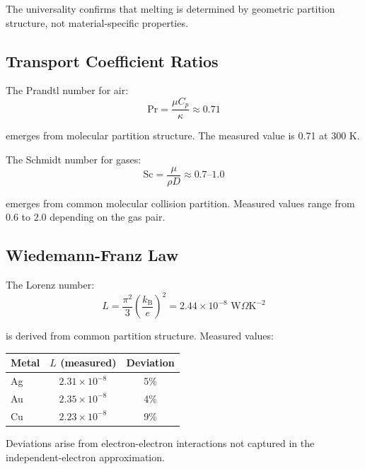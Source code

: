 \documentclass[twocolumn,10pt,aps,prd,superscriptaddress,nofootinbib]{revtex4-2}
\theoremstyle{remark}
\newcommand{\kB}{k_{\mathrm{B}}}
\begin{document}
The universality confirms that melting is determined by geometric partition structure, not material-specific properties.

\subsection{Transport Coefficient Ratios}

The Prandtl number for air:
\begin{equation}
\text{Pr} = \frac{\mu C_p}{\kappa} \approx 0.71
\label{eq:prandtl}
\end{equation}

emerges from molecular partition structure. The measured value is 0.71 at 300 K.

The Schmidt number for gases:
\begin{equation}
\text{Sc} = \frac{\mu}{\rho D} \approx 0.7\text{--}1.0
\label{eq:schmidt}
\end{equation}

emerges from common molecular collision partition. Measured values range from 0.6 to 2.0 depending on the gas pair.

\subsection{Wiedemann-Franz Law}

The Lorenz number:
\begin{equation}
L = \frac{\pi^2}{3}\left(\frac{\kB}{e}\right)^2 = 2.44 \times 10^{-8} \text{ W}\Omega\text{K}^{-2}
\label{eq:lorenz_number}
\end{equation}

is derived from common partition structure. Measured values:

\begin{center}
\begin{tabular}{lcc}
\toprule
Metal & $L$ (measured) & Deviation \\
\midrule
Ag & $2.31 \times 10^{-8}$ & 5\% \\
Au & $2.35 \times 10^{-8}$ & 4\% \\
Cu & $2.23 \times 10^{-8}$ & 9\% \\
\bottomrule
\end{tabular}
\end{center}

Deviations arise from electron-electron interactions not captured in the independent-electron approximation.
\end{document}
